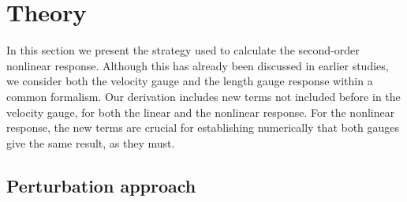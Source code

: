 \documentclass[floatfix,prb,aps,superscriptaddress,11pt]{revtex4}
\begin{document}
\section{Theory}

\label{theory}

In this section we present the strategy used to calculate the second-order
nonlinear response.
Although this has already been discussed in earlier studies, we consider
both the velocity gauge and the length gauge response
within a common formalism. Our derivation includes new terms not included
before in the velocity gauge, for both the linear and the nonlinear
response. For the nonlinear response, the new terms are crucial for
establishing 
numerically that both gauges give the same result, as they must. 

\subsection{Perturbation approach}
\end{document}
